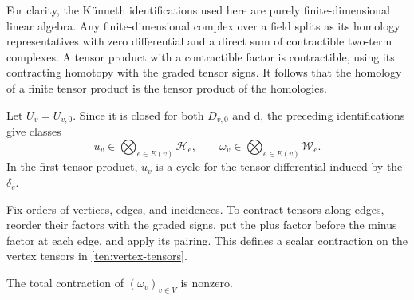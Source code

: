 For clarity, the K\"unneth identifications used here are purely
finite-dimensional linear algebra.  Any finite-dimensional complex over
a field splits as its homology representatives with zero differential
and a direct sum of contractible two-term complexes.  A tensor product
with a contractible factor is contractible, using its contracting
homotopy with the graded tensor signs.  It follows that the homology of
a finite tensor product is the tensor product of the homologies.

Let \(U_v=U_{v,0}\).  Since it is closed for both \(D_{v,0}\) and
\(\mathrm d\), the preceding identifications give classes
\begin{equation}\label{ten:vertex-tensors}
 u_v\in\bigotimes_{e\in E(v)}\mathcal H_e,
 \qquad
 \omega_v\in\bigotimes_{e\in E(v)}\mathcal W_e.
\end{equation}
In the first tensor product, \(u_v\) is a cycle for the tensor
differential induced by the \(\delta_e\).

Fix orders of vertices, edges, and incidences.  To contract tensors along
edges, reorder their factors with the graded signs, put the plus factor
before the minus factor at each edge, and apply its pairing.  This
defines a scalar contraction on the vertex tensors in
\eqref{ten:vertex-tensors}.

\begin{lemma}\label{ten:nonzero}
The total contraction of \((\omega_v)_{v\in V}\) is nonzero.
\end{lemma}

